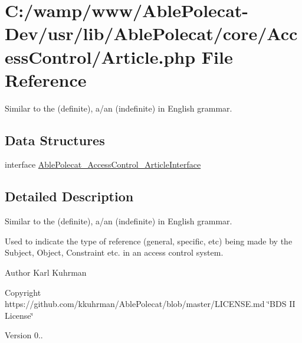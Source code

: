 \hypertarget{_article_8php}{}\section{C\+:/wamp/www/\+Able\+Polecat-\/\+Dev/usr/lib/\+Able\+Polecat/core/\+Access\+Control/\+Article.php File Reference}
\label{_article_8php}


Similar to \textquotesingle{}the\textquotesingle{} (definite), \textquotesingle{}a\textquotesingle{}/\textquotesingle{}an\textquotesingle{} (indefinite) in English grammar.  


\subsection*{Data Structures}
\begin{DoxyCompactItemize}
\item 
interface \hyperlink{interface_able_polecat___access_control___article_interface}{Able\+Polecat\+\_\+\+Access\+Control\+\_\+\+Article\+Interface}
\end{DoxyCompactItemize}


\subsection{Detailed Description}
Similar to \textquotesingle{}the\textquotesingle{} (definite), \textquotesingle{}a\textquotesingle{}/\textquotesingle{}an\textquotesingle{} (indefinite) in English grammar. 

Used to indicate the type of reference (general, specific, etc) being made by the Subject, Object, Constraint etc. in an access control system.

\begin{DoxyAuthor}{Author}
Karl Kuhrman 
\end{DoxyAuthor}
\begin{DoxyCopyright}{Copyright}
https\+://github.com/kkuhrman/\+Able\+Polecat/blob/master/\+L\+I\+C\+E\+N\+S\+E.\+md \char`\"{}\+B\+D\+S I\+I License\char`\"{} 
\end{DoxyCopyright}
\begin{DoxyVersion}{Version}
0.. 
\end{DoxyVersion}
